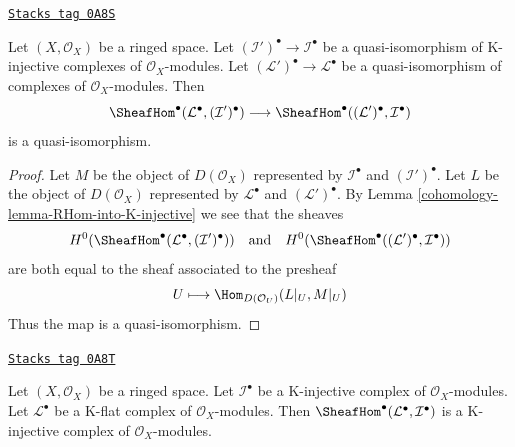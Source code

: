\begin{lemma}
\label{cohomology-lemma-RHom-well-defined}
\href{https://stacks.math.columbia.edu/tag/0A8S}{\texttt{Stacks tag 0A8S}}

Let $(X, \mathcal{O}_X)$ be a ringed space. Let
$(\mathcal{I}')^\bullet \to \mathcal{I}^\bullet$
be a quasi-isomorphism of K-injective complexes of $\mathcal{O}_X$-modules.
Let $(\mathcal{L}')^\bullet \to \mathcal{L}^\bullet$
be a quasi-isomorphism of complexes of $\mathcal{O}_X$-modules.
Then
$$
\SheafHom^\bullet(\mathcal{L}^\bullet, (\mathcal{I}')^\bullet)
\longrightarrow
\SheafHom^\bullet((\mathcal{L}')^\bullet, \mathcal{I}^\bullet)
$$
is a quasi-isomorphism.
\end{lemma}

\begin{proof}

Let $M$ be the object of $D(\mathcal{O}_X)$ represented by
$\mathcal{I}^\bullet$ and $(\mathcal{I}')^\bullet$.
Let $L$ be the object of $D(\mathcal{O}_X)$ represented by
$\mathcal{L}^\bullet$ and $(\mathcal{L}')^\bullet$.
By Lemma \ref{cohomology-lemma-RHom-into-K-injective}
we see that the sheaves
$$
H^0(\SheafHom^\bullet(\mathcal{L}^\bullet, (\mathcal{I}')^\bullet))
\quad\text{and}\quad
H^0(\SheafHom^\bullet((\mathcal{L}')^\bullet, \mathcal{I}^\bullet))
$$
are both equal to the sheaf associated to the presheaf
$$
U \longmapsto \Hom_{D(\mathcal{O}_U)}(L|_U, M|_U)
$$
Thus the map is a quasi-isomorphism.
\end{proof}

\begin{lemma}
\label{cohomology-lemma-RHom-from-K-flat-into-K-injective}
\href{https://stacks.math.columbia.edu/tag/0A8T}{\texttt{Stacks tag 0A8T}}

Let $(X, \mathcal{O}_X)$ be a ringed space. Let $\mathcal{I}^\bullet$
be a K-injective complex of $\mathcal{O}_X$-modules. Let
$\mathcal{L}^\bullet$ be a K-flat complex of $\mathcal{O}_X$-modules.
Then $\SheafHom^\bullet(\mathcal{L}^\bullet, \mathcal{I}^\bullet)$
is a K-injective complex of $\mathcal{O}_X$-modules.
\end{lemma}

